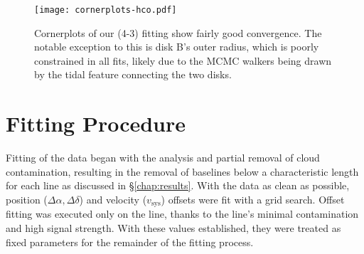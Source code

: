 
\begin{figure}[htp]
  \hspace*{\fill}%
  \texttt{[image: cornerplots-hco.pdf]}\hfill%
  \hspace*{\fill}%
  \caption{Cornerplots of our \hco(4-3) fitting show fairly good convergence. The notable exception to this is disk B's outer radius, which is poorly constrained in all fits, likely due to the MCMC walkers being drawn by the tidal feature connecting the two disks.}
  \label{fig:cornerplot_hco}
\end{figure}





\section{Fitting Procedure}
\label{section:fitting_procedure}

Fitting of the data began with the analysis and partial removal of cloud contamination, resulting in the removal of baselines below a characteristic length for each line as discussed in \S\ref{chap:results}. With the data as clean as possible, position ($\Delta \alpha, \Delta \delta$) and velocity ($v_\text{sys}$) offsets were fit with a grid search. Offset fitting was executed only on the \hco{} line, thanks to the line's minimal contamination and high signal strength. With these values established, they were treated as fixed parameters for the remainder of the fitting process.

